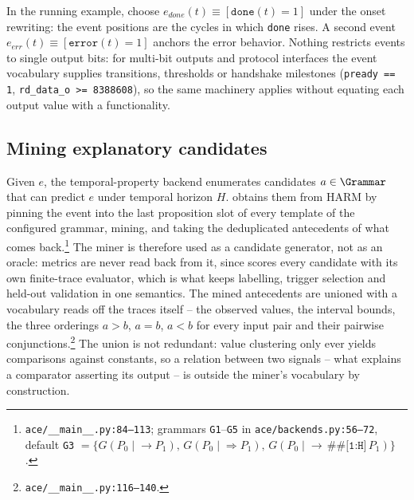 In the running example, choose $e_{done}(t)\equiv[\texttt{done}(t)=1]$ under the onset
rewriting: the event positions are the cycles in which \texttt{done} rises. A second event
$e_{err}(t)\equiv[\texttt{error}(t)=1]$ anchors the error behavior. Nothing restricts events
to single output bits: for multi-bit outputs and protocol interfaces the event vocabulary
supplies transitions, thresholds or handshake milestones (\texttt{pready == 1},
\texttt{rd\_data\_o >= 8388608}), so the same machinery applies without equating each output
value with a functionality.

\subsection{Mining explanatory candidates}
\label{sec:candidates}
Given $e$, the temporal-property backend enumerates candidates $a\in\Grammar$ that can
predict $e$ under temporal horizon $H$. \ACE{} obtains them from HARM by pinning the event
into the last proposition slot of every template of the configured grammar, mining, and
taking the deduplicated antecedents of what comes back.\footnote{\texttt{ace/\_\_main\_\_.py:84--113};
grammars \texttt{G1}--\texttt{G5} in \texttt{ace/backends.py:56--72}, default \texttt{G3}
$=\{G(P_0\!\mid\!\to P_1),\,G(P_0\!\mid\!\Rightarrow P_1),\,G(P_0\!\mid\!\to\,\texttt{\#\#[1:H]}\,P_1)\}$.}
The miner is therefore used as a candidate generator, not as an oracle: metrics are never
read back from it, since \ACE{} scores every candidate with its own finite-trace evaluator,
which is what keeps labelling, trigger selection and held-out validation in one semantics.
The mined antecedents are unioned with a vocabulary \ACE{} reads off the traces itself --
the observed values, the interval bounds, the three orderings $a>b$, $a=b$, $a<b$ for every
input pair and their pairwise conjunctions.\footnote{\texttt{ace/\_\_main\_\_.py:116--140}.}
The union is not redundant: value clustering only ever yields comparisons against constants,
so a relation between two signals -- what explains a comparator asserting its output -- is
outside the miner's vocabulary by construction.

